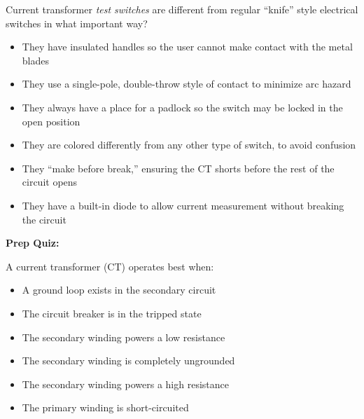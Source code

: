 Current transformer {\it test switches} are different from regular ``knife'' style electrical switches in what important way?

\begin{itemize}
\item{} They have insulated handles so the user cannot make contact with the metal blades
\vskip 5pt 
\item{} They use a single-pole, double-throw style of contact to minimize arc hazard
\vskip 5pt 
\item{} They always have a place for a padlock so the switch may be locked in the open position
\vskip 5pt 
\item{} They are colored differently from any other type of switch, to avoid confusion
\vskip 5pt 
\item{} They ``make before break,'' ensuring the CT shorts before the rest of the circuit opens
\vskip 5pt 
\item{} They have a built-in diode to allow current measurement without breaking the circuit
\end{itemize}


\vfil \eject

\noindent
{\bf Prep Quiz:}

A current transformer (CT) operates best when:

\begin{itemize}
\item{} A ground loop exists in the secondary circuit
\vskip 5pt 
\item{} The circuit breaker is in the tripped state
\vskip 5pt 
\item{} The secondary winding powers a low resistance
\vskip 5pt 
\item{} The secondary winding is completely ungrounded
\vskip 5pt 
\item{} The secondary winding powers a high resistance 
\vskip 5pt 
\item{} The primary winding is short-circuited
\end{itemize}




